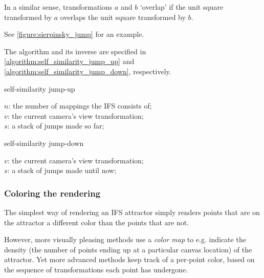 \documentclass[11pt]{article}
\begin{document}
In a similar sense, transformations \(a\) and \(b\) `overlap' if the unit square transformed by \(a\) overlaps the unit square transformed by \(b\).

See \autoref{figure:sierpinsky_jump} for an example. 

The algorithm and its inverse are specified in \autoref{algorithm:self_similarity_jump_up} and \autoref{algorithm:self_similarity_jump_down}, respectively.

\begin{algorithm}
\caption{self-similarity jump-up}
\label{algorithm:self_similarity_jump_up}
  $n$: the number of mappings the IFS consists of; \\
  $v$: the current camera's view transformation; \\
  $s$: a stack of jumps made so far; \\
\end{algorithm}

\begin{algorithm}
\caption{self-similarity jump-down}
\label{algorithm:self_similarity_jump_down}
  $v$: the current camera's view transformation; \\
  $s$: a stack of jumps made until now; \\
\end{algorithm}

\subsubsection{Coloring the rendering}
\label{sec:org9d35f79}
\label{subsection:coloring}

The simplest way of rendering an IFS attractor simply renders points that are on the attractor a different color
than the points that are not.

However, more visually pleasing methods use a \emph{color map} to e.g. indicate the density (the number of points ending up at a particular canvas location) of the attractor.
Yet more advanced methods \cite{draves2003fractal} keep track of a per-point color, based on the sequence of transformations each point has undergone.
\end{document}
